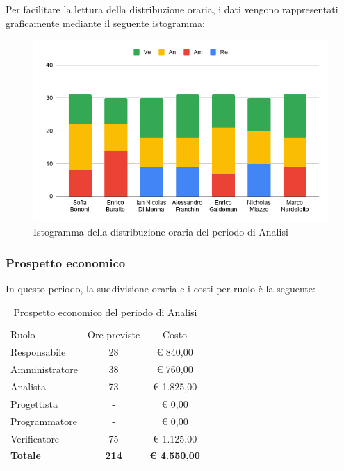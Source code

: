 \documentclass[../piano-di-progetto.tex]{subfiles}
\begin{document}
  Per facilitare la lettura della distribuzione oraria, i dati vengono rappresentati graficamente mediante il seguente istogramma:
  \begin{figure}[H]
    \centering
    \includegraphics[width=12cm]{img/ore-analisi.png}
    \caption{Istogramma della distribuzione oraria del periodo di Analisi}
    \label{fig:ore-componente-analisi}
  \end{figure}

  \subsubsection{Prospetto economico}
  In questo periodo, la suddivisione oraria e i costi per ruolo è la seguente:

  \begin{table}[H]
    \centering
    \begin{tabular}{lcc}
      Ruolo           & Ore previste & Costo               \\
      Responsabile    & 28           & € 840,00            \\
      Amministratore  & 38           & € 760,00            \\
      Analista        & 73           & € 1.825,00          \\
      Progettista     & -            & € 0,00              \\
      Programmatore   & -            & € 0,00              \\
      Verificatore    & 75           & € 1.125,00          \\
      \textbf{Totale} & \textbf{214} & \textbf{€ 4.550,00}
    \end{tabular}
    \caption{Prospetto economico del periodo di Analisi}
  \end{table}
\end{document}

